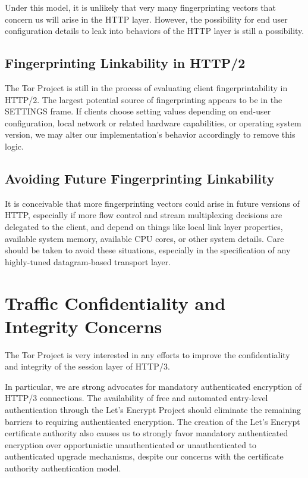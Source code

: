 \documentclass[letterpaper,11pt]{llncs}
\begin{document}
Under this model, it is unlikely that very many fingerprinting vectors that
concern us will arise in the HTTP layer. However, the possibility for end user
configuration details to leak into behaviors of the HTTP layer is still a
possibility.

\subsection{Fingerprinting Linkability in HTTP/2}

The Tor Project is still in the process of evaluating client
fingerprintability in HTTP/2. The largest potential source of fingerprinting
appears to be in the SETTINGS frame. If clients choose setting values
depending on end-user configuration, local network or related hardware
capabilities, or operating system version, we may alter our implementation's
behavior accordingly to remove this logic.

\subsection{Avoiding Future Fingerprinting Linkability}

It is conceivable that more fingerprinting vectors could arise in future
versions of HTTP, especially if more flow control and stream multiplexing
decisions are delegated to the client, and depend on things like local link
layer properties, available system memory, available CPU cores, or other
system details. Care should be taken to avoid these situations, especially
in the specification of any highly-tuned datagram-based transport layer.

\section{Traffic Confidentiality and Integrity Concerns}

The Tor Project is very interested in any efforts to improve the
confidentiality and integrity of the session layer of HTTP/3. 

In particular, we are strong advocates for mandatory authenticated encryption
of HTTP/3 connections.  The availability of free and automated entry-level
authentication through the Let's Encrypt Project\cite{lets-encrypt} should
eliminate the remaining barriers to requiring authenticated encryption. The
creation of the Let's Encrypt certificate authority also causes us to strongly
favor mandatory authenticated encryption over opportunistic unauthenticated or
unauthenticated to authenticated upgrade mechanisms, despite our concerns with
the certificate authority authentication model.
\end{document}
